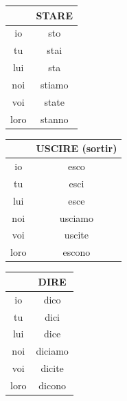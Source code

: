 \documentclass[12pt, openany]{report}
\begin{document}
\newline 
\begin{minipage}{.33\textwidth}
    \begin{center}
        \begin{tabular}{c||c}
            & STARE\\ \hline
            io & sto\\
            tu & stai\\
            lui & sta\\
            noi & stiamo\\
            voi & state\\
            loro & stanno\\
        \end{tabular}
    \end{center}
\end{minipage}
\begin{minipage}{.33\textwidth}
    \begin{center}
        \begin{tabular}{c||c}
            & USCIRE (sortir)\\ \hline
            io & esco\\
            tu & esci\\
            lui & esce\\
            noi & usciamo\\
            voi & uscite\\
            loro & escono\\
        \end{tabular}
    \end{center}
\end{minipage}
\begin{minipage}{.33\textwidth}
    \begin{center}
        \begin{tabular}{c||c}
            & DIRE\\ \hline
            io & dico\\
            tu & dici\\
            lui & dice\\
            noi & diciamo\\
            voi & dicite\\
            loro & dicono\\
        \end{tabular}
    \end{center}
\end{minipage}
\end{document}
